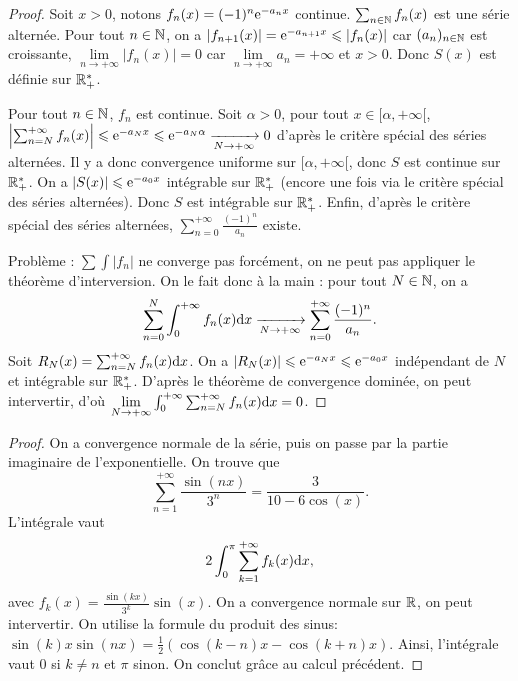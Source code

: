 \documentclass[12pt]{article}
\begin{document}
\begin{proof}
    Soit $x>0$, notons $f_n(x)=(-1)^{n}\mathrm{e}^{-a_n x}$ continue. $\sum_{n\in\mathbb{N}}f_n(x)$ est une série alternée. Pour tout $n\in\mathbb{N}$, on a $\left\lvert f_{n+1}(x)\right\rvert=\mathrm{e}^{-a_{n+1} x}\leqslant\left\lvert f_n(x)\right\rvert$ car $(a_n)_{n\in\mathbb{N}}$ est croissante, $\lim\limits_{n\to+\infty}\left\lvert f_n(x)\right\rvert=0$ car $\lim\limits_{n\to+\infty}a_n=+\infty$ et $x>0$. Donc $S(x)$ est définie sur $\mathbb{R}_{+}^{*}$.

    Pour tout $n\in\mathbb{N}$, $f_n$ est continue. Soit $\alpha>0$, pour tout $x\in[\alpha,+\infty[$, $\left\lvert\sum_{n=N}^{+\infty}f_n(x)\right\rvert\leqslant\mathrm{e}^{-a_{N}x}\leqslant\mathrm{e}^{-a_N \alpha}\xrightarrow[N\to+\infty]{}0$ d'après le critère spécial des séries alternées. Il y a donc convergence uniforme sur $[\alpha,+\infty[$, donc $S$ est continue sur $\mathbb{R}_{+}^{*}$. On a $\left\lvert S(x)\right\rvert\leqslant\mathrm{e}^{-a_0 x}$ intégrable sur $\mathbb{R}_{+}^{*}$ (encore une fois via le critère spécial des séries alternées). Donc $S$ est intégrable sur $\mathbb{R}_{+}^{*}$. Enfin, d'après le critère spécial des séries alternées, $\sum_{n=0}^{+\infty}\frac{(-1)^{n}}{a_n}$ existe.

    Problème : $\sum\int\left\lvert f_n\right\rvert$ ne converge pas forcément, on ne peut pas appliquer le théorème d'interversion.
    On le fait donc à la main : pour tout $N\in\mathbb{N}$, on a 
    \begin{equation*}
        \sum_{n=0}^{N}\int_{0}^{+\infty}f_n(x)\mathrm{d} x\xrightarrow[N\to+\infty]{}\sum_{n=0}^{+\infty}\frac{(-1)^{n}}{a_n}.
    \end{equation*}
    Soit $R_N(x)=\sum_{n=N}^{+\infty}f_n(x)\mathrm{d} x$. On a $\left\lvert R_N(x)\right\rvert\leqslant\mathrm{e}^{-a_N x}\leqslant \mathrm{e}^{-a_0 x}$ indépendant de $N$ et intégrable sur $\mathbb{R}_{+}^{*}$. D'après le théorème de convergence dominée, on peut intervertir, d'où $\lim\limits_{N\to+\infty}\int_{0}^{+\infty}\sum_{n=N}^{+\infty}f_n(x)\mathrm{d} x=0$.
\end{proof}

\begin{proof}
    On a convergence normale de la série, puis on passe par la partie imaginaire de l'exponentielle. On trouve que 
    \begin{equation*}
        \sum_{n=1}^{+\infty}\frac{\sin(nx)}{3^{n}}=\frac{3}{10-6\cos(x)}.
    \end{equation*}
    L'intégrale vaut
    \begin{equation*}
        2\int_{0}^{\pi}\sum_{k=1}^{+\infty}f_k(x)\mathrm{d} x,
    \end{equation*}
    avec $f_k(x)=\frac{\sin(kx)}{3^{k}}\sin(x)$. On a convergence normale sur $\mathbb{R}$, on peut intervertir. On utilise la formule du produit des sinus: $\sin(k)x\sin(nx)=\frac{1}{2}\left(\cos(k-n)x-\cos(k+n)x\right)$. Ainsi, l'intégrale vaut 0 si $k\neq n$ et $\pi$ sinon. On conclut grâce au calcul précédent.
\end{proof}
\end{document}
